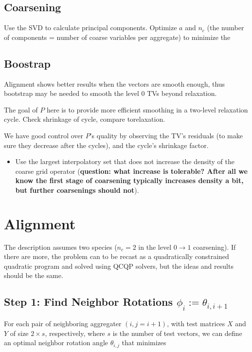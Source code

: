 \documentclass{article}
\begin{document}
\subsection{Coarsening}
Use the SVD to calculate principal components. Optimize $a$ and $n_c$ (the number of components = number of coarse variables per aggregate) to minimize the 

\subsection{Boostrap}
Alignment shows better results when the vectors are smooth enough, thus bootstrap may be needed to smooth the level 0 TVs beyond relaxation.

The goal of $P$ here is to provide more efficient smoothing in a two-level relaxation cycle. Check shrinkage of cycle, compare torelaxation.

We have good control over $P$'s quality by observing the TV's residuals (to make sure they decrease after the cycles), and the cycle's shrinkage factor.

\begin{itemize}
  \item Use the largest interpolatory set that does not increase the density of the coarse grid operator ({\bf question: what increase is tolerable? After all we know the first stage of coarsening typically increases density a bit, but further coarsenings should not}).
  
\end{itemize}

\section{Alignment}
The description assumes two species ($n_c=2$ in the level $0 \rightarrow 1$ coarsening). If there are more, the problem can to be recast as a quadratically constrained quadratic program and solved using QCQP solvers, but the ideas and results should be the same.

\subsection{Step 1: Find Neighbor Rotations $\phi_i := \theta_{i,i+1}$}
For each pair of neighboring aggregater $(i,j=i+1)$, with test matrices $X$ and $Y$ of size $2 \times s$, respectively, where $s$ is the number of test vectors, we can define an optimal neighbor rotation angle $\theta_{i,j}$ that minimizes
\end{document}

